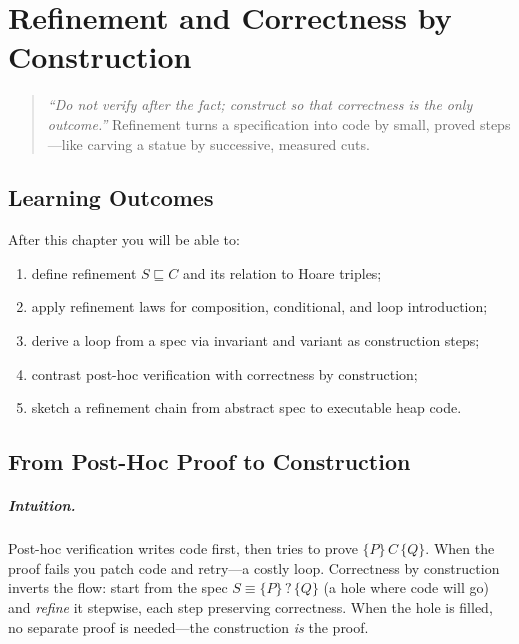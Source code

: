 \chapter{Refinement and Correctness by Construction}
\label{ch:refinement}

\begin{quote}
\emph{``Do not verify after the fact; construct so that correctness is the only outcome.''} Refinement turns a specification into code by small, proved steps—like carving a statue by successive, measured cuts.
\end{quote}

\noindent{}
\vspace{0.4em}

\section*{Learning Outcomes}
After this chapter you will be able to:
\begin{enumerate}[label=(L\arabic*)]
    \item define refinement $S \sqsubseteq C$ and its relation to Hoare triples;
    \item apply refinement laws for composition, conditional, and loop introduction;
    \item derive a loop from a spec via invariant and variant as construction steps;
    \item contrast post-hoc verification with correctness by construction;
    \item sketch a refinement chain from abstract spec to executable heap code.
\end{enumerate}

\section{From Post-Hoc Proof to Construction}
\label{sec:post-hoc-vs-calc}
\paragraph{Intuition.} Post-hoc verification writes code first, then tries to prove $\{P\}\,C\,\{Q\}$. When the proof fails you patch code and retry—a costly loop. Correctness by construction inverts the flow: start from the spec $S\equiv\{P\}\,?\,\{Q\}$ (a hole where code will go) and \emph{refine} it stepwise, each step preserving correctness. When the hole is filled, no separate proof is needed—the construction \emph{is} the proof.

